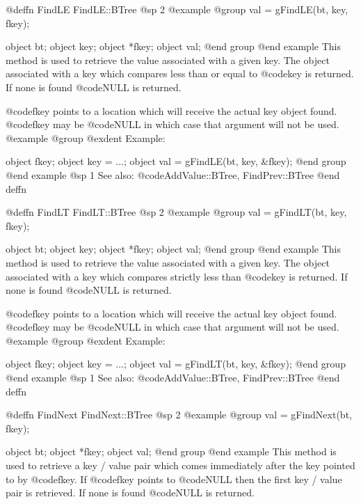 @deffn {FindLE} FindLE::BTree
@sp 2
@example
@group
val = gFindLE(bt, key, fkey);

object  bt;
object  key;
object  *fkey;
object  val;
@end group
@end example
This method is used to retrieve the value associated with a given key.
The object associated with a key which compares less than or equal to
@code{key} is returned.  If none is found @code{NULL} is returned.

@code{fkey} points to a location which will receive the actual key
object found.  @code{fkey} may be @code{NULL} in which case that
argument will not be used.
@example
@group
@exdent Example:

object  fkey;
object  key = ...;
object  val = gFindLE(bt, key, &fkey);
@end group
@end example
@sp 1
See also:  @code{AddValue::BTree, FindPrev::BTree}
@end deffn












@deffn {FindLT} FindLT::BTree
@sp 2
@example
@group
val = gFindLT(bt, key, fkey);

object  bt;
object  key;
object  *fkey;
object  val;
@end group
@end example
This method is used to retrieve the value associated with a given key.
The object associated with a key which compares strictly less than
@code{key} is returned.  If none is found @code{NULL} is returned.

@code{fkey} points to a location which will receive the actual key
object found.  @code{fkey} may be @code{NULL} in which case that
argument will not be used.
@example
@group
@exdent Example:

object  fkey;
object  key = ...;
object  val = gFindLT(bt, key, &fkey);
@end group
@end example
@sp 1
See also:  @code{AddValue::BTree, FindPrev::BTree}
@end deffn















@deffn {FindNext} FindNext::BTree
@sp 2
@example
@group
val = gFindNext(bt, fkey);

object  bt;
object  *fkey;
object  val;
@end group
@end example
This method is used to retrieve a key / value pair which comes
immediately after the key pointed to by @code{fkey}.  If @code{fkey}
points to @code{NULL} then the first key / value pair is retrieved.  If
none is found @code{NULL} is returned.

